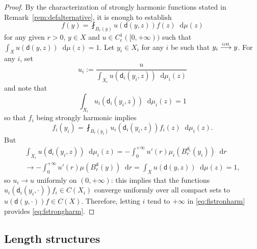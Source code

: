 \documentclass[10pt]{amsart}
\def\To#1{\mathchoice{\xrightarrow{\textstyle\kern4pt#1\kern3pt}}{\stackrel{#1}{\longrightarrow}}{}{}}
\newcommand{\rmc}{\mathrm{c}}
\newcommand{\sGH}{{\scriptscriptstyle\mathrm{GH}\,}}
\theoremstyle{plain}
\theoremstyle{definition}
\newcommand{\di}{\mathop{}\!\mathrm{d}}
\newcommand{\dist}{\mathsf{d}}
\begin{document}
\begin{proof}
By the characterization of strongly harmonic functions stated in Remark~\ref{rem:defalternative}, it is enough to establish
\begin{equation}\label{eq:fstrongharm}
f(y) = \fint_{B_r(y)}u(\dist(y,z))f(z)\di \mu(z)
\end{equation}
for any given $r>0$, $y \in X$ and $u \in C^1_\rmc([0,+\infty))$ such that $\int_X u(\dist(y,z)) \di \mu(z)=1$.
Let $y_i \in X_i$ for any $i$ be such that $y_i \To{\sGH} y$. For any $i$, set
\[
u_i:=\frac{u}{\int_{X_i} u(\dist_i(y_i,z)) \di \mu_i(z)}
\]
and note that
\begin{equation}
\int_{X_i} u_i(\dist_i(y_i,z)) \di \mu_i(z) = 1
\end{equation}
so that $f_i$ being strongly harmonic implies
\begin{equation}\label{eq:fistronharm}
f_i(y_i) = \fint_{B_r(y_i)}u_i(\dist_i(y_i,z))f_i(z)\di \mu_i(z).
\end{equation}
But
\begin{multline*}
\int_{X_i} u(\dist_i(y_i,z)) \di \mu_i(z) = - \int_0^{+\infty} u'(r) \mu_i(B_r^{\dist_i}(y_i)) \di r\\
\to - \int_0^{+\infty} u'(r) \mu(B_r^{\dist}(y)) \di r = \int_{X} u(\dist(y,z)) \di \mu(z)=1,
\end{multline*}
so $u_i \to u$ uniformly on $(0,+\infty)$: this implies that the functions $u_i(\dist_i(y_i,\cdot))f_i \in C(X_i)$ converge uniformly over all compact sets to $u(\dist(y,\cdot))f \in C(X)$. Therefore, letting $i$ tend to $+\infty$ in \eqref{eq:fistronharm} provides \eqref{eq:fstrongharm}.
\end{proof}

\subsection*{Length structures}
\end{document}
